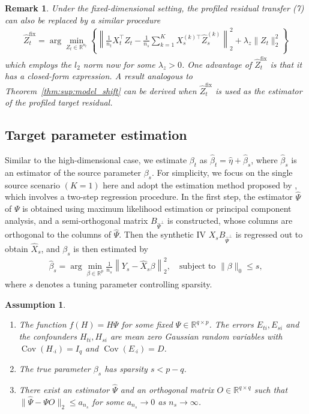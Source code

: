 \documentclass[12pt]{article}
\newtheorem{assump}{Assumption}
\newtheorem{remark}{Remark}
\begin{document}
\begin{remark}
    Under the fixed-dimensional setting, the profiled residual transfer (7) can also be replaced by a similar procedure 
    \begin{align}
    \label{eq:sup:profiled_fixed_p}
        \hat{Z}_t^{\text{fix}} = \arg\min_{Z_t\in \mathbb{R}^{n_t}} \left\{\left\|\frac{1}{n_t}X_t^\top Z_t - \frac{1}{n_s}\sum_{k=1}^K X_s^{(k)\top}\hat{Z}_s^{(k)}\right\|_2^2 +\lambda_z \|Z_t\|_2^2 \right\}
    \end{align}
    which employs the $l_2$ norm now for some $\lambda_z>0$. One advantage of $\hat{Z}_t^{\text{fix}}$ is that it has a closed-form expression.  A result analogous to Theorem~\ref{thm:sup:model_shift} can be derived when $\hat{Z}_t^{\text{fix}}$ is used as the estimator of the profiled target residual. 
\end{remark}

\subsection{Target parameter estimation}
Similar to the high-dimensional case, we estimate $\beta_t$ as $\hat{\beta}_t = \hat{\eta} + \hat{\beta}_s$, where $\hat{\beta}_s$ is an estimator of the source parameter $\beta_s$. For simplicity, we focus on the single source scenario $(K=1)$ here and adopt the estimation method proposed by \cite{tang2023synthetic}, which involves a two-step regression procedure. In the first step, the estimator $\hat{\Psi}$ of $\Psi$ is obtained using maximum likelihood estimation or principal component analysis, and a semi-orthogonal matrix $B_{\hat{\Psi}^{\perp}}$ is constructed, whose columns are orthogonal to the columns of $\hat{\Psi}$. Then the synthetic IV $X_s B_{\hat{\Psi}^{\perp}}$ is regressed out to obtain $\hat{X}_s$, and $\beta_s$ is then estimated by 
\begin{align*}
    \hat{\beta}_s = \arg\min_{\beta \in \mathbb{R}^p} \frac{1}{n_s}\left\|Y_s - \hat{X}_s \beta\right\|_2^2,\quad \text{subject to } \|\beta\|_0 \le s,
\end{align*}
where $s$ denotes a tuning parameter controlling sparsity.
\begin{assump}
\label{assum:sup:source_fixed}
    \begin{enumerate}
         \item[a.] The function $f(H) = H\Psi$ for some fixed $\Psi \in \mathbb{R}^{q\times p}$. The errors $E_{ti}, E_{si}$ and the confounders $H_{ti},H_{si}$ are mean zero Gaussian random variables with $\operatorname{Cov}(H_{\cdot i}) = I_q$ and $\operatorname{Cov}(E_{\cdot i}) = D$.
        \item[b.] The true parameter $\beta_s$ has sparsity $s < p - q $.
        \item[c.] There exist an estimator $\hat{\Psi}$ and an orthogonal matrix $O\in \mathbb{R}^{q\times q}$ such that 
        $\|\hat{\Psi} - \Psi O\|_2 \le a_{n_s}$ for some $a_{n_s}\rightarrow 0$ as $n_s\rightarrow \infty$.
    \end{enumerate}
\end{assump}
\end{document}
